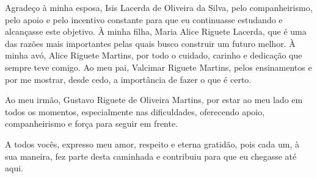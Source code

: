 Agradeço à minha esposa, Isis Lacerda de Oliveira da Silva, pelo companheirismo, pelo apoio e pelo incentivo constante para que eu continuasse estudando e alcançasse este objetivo. À minha filha, Maria Alice Riguete Lacerda, que é uma das razões mais importantes pelas quais busco construir um futuro melhor. À minha avó, Alice Riguete Martins, por todo o cuidado, carinho e dedicação que sempre teve comigo. Ao meu pai, Valcimar Riguete Martins, pelos ensinamentos e por me mostrar, desde cedo, a importância de fazer o que é certo.

Ao meu irmão, Gustavo Riguete de Oliveira Martins, por estar ao meu lado em todos os momentos, especialmente nas dificuldades, oferecendo apoio, companheirismo e força para seguir em frente.

A todos vocês, expresso meu amor, respeito e eterna gratidão, pois cada um, à sua maneira, fez parte desta caminhada e contribuiu para que eu chegasse até aqui.